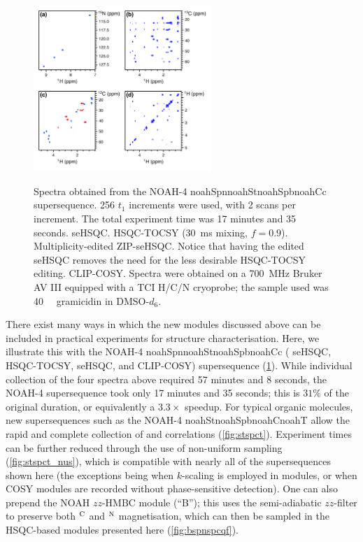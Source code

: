 \documentclass[11pt]{article}
\newcommand*{\noahfour}[4]{\csname noah#1\endcsname\csname noah#2\endcsname\csname noah#3\endcsname\csname noah#4\endcsname}
\newcommand*{\noahB}{B}
\newcommand*{\carbon}{\ce{^{13}C}}
\newcommand*{\nitrogen}{\ce{^{15}N}}
\newcommand*{\magn}[1]{\ce{^1H}$^{#1}$}
\newcommand*{\grami}{Spectra were obtained on a \SI{700}{\MHz} Bruker AV III equipped with a TCI H/C/N cryoprobe; the sample used was \SI{40}{\milli\molar} gramicidin in DMSO-$d_6$.}
\begin{document}
\begin{refsection}
\begin{figure}
    \centering
    \includegraphics[width=0.6\textwidth]{spnstspcc.png}
    {\label{fig:spnstspcc_spn}}
    {\label{fig:spnstspcc_st}}
    {\label{fig:spnstspcc_sp}}
    {\label{fig:spnstspcc_cc}}
    \caption{
        Spectra obtained from the NOAH-4 \noahfour{Spn}{St}{Spb}{Cc} supersequence.
        256 $t_1$ increments were used, with 2 scans per increment.
        The total experiment time was 17 minutes and 35 seconds.
        \textbf{} \nitrogen{} seHSQC.
        \textbf{} \carbon{} HSQC-TOCSY (\SI{30}{ms} mixing, $f = 0.9$).
        \textbf{} Multiplicity-edited \carbon{} ZIP-seHSQC. Notice that having the edited seHSQC removes the need for the less desirable HSQC-TOCSY editing.
        \textbf{} CLIP-COSY.
        \grami{}
    }
    \label{fig:spnstspcc}
\end{figure}

There exist many ways in which the new modules discussed above can be included in practical experiments for structure characterisation.
Here, we illustrate this with the NOAH-4 \noahfour{Spn}{St}{Spb}{Cc} (\nitrogen{} seHSQC, \carbon{} HSQC-TOCSY, \carbon{} seHSQC, and CLIP-COSY) supersequence (\cref{fig:spnstspcc}).
While individual collection of the four spectra above required 57 minutes and 8 seconds, the NOAH-4 supersequence took only 17 minutes and 35 seconds; this is $31\%$ of the original duration, or equivalently a $3.3\times$ speedup.
For typical organic molecules, new supersequences such as the NOAH-4 \noahfour{St}{Spb}{C}{T} allow the rapid and complete collection of  and  correlations (\cref{fig:stspct}).
Experiment times can be further reduced through the use of non-uniform sampling\autocite{nus} (\cref{fig:stspct_nus}), which is compatible with nearly all of the supersequences shown here (the exceptions being when $k$-scaling is employed in \nitrogen{} modules, or when COSY modules are recorded without phase-sensitive detection).
One can also prepend the NOAH $zz$-HMBC module (``\noahB{}'');\autocite{Kupce2018CC, Kupce2019JMR} this uses the semi-adiabatic $zz$-filter to preserve both \magn{\ce{C}} and \magn{\ce{N}} magnetisation, which can then be sampled in the HSQC-based modules presented here (\cref{fig:bspnspcqf}).


\end{refsection}
\end{document}
